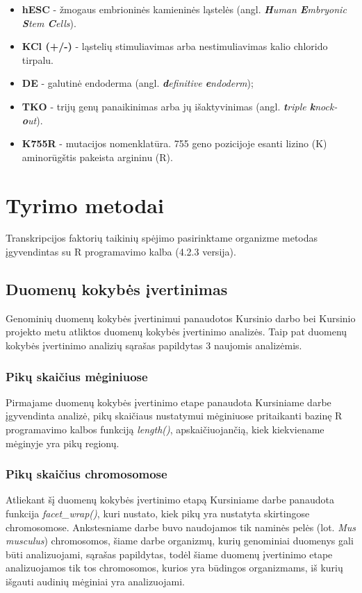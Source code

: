 \documentclass[12pt]{article}
\begin{document}
\begin{itemize}
    \item \textbf{hESC} - žmogaus embrioninės kamieninės ląstelės
          (angl. \emph{\textbf{H}uman \textbf{E}mbryonic \textbf{S}tem
          \textbf{C}ells}).
    \item \textbf{KCl (+/-)} - ląstelių stimuliavimas arba nestimuliavimas kalio
          chlorido tirpalu.
    \item \textbf{DE} - galutinė endoderma (angl. \emph{\textbf{d}efinitive
          \textbf{e}ndoderm});
    \item \textbf{TKO} - trijų genų panaikinimas arba jų išaktyvinimas
          (angl. \emph{\textbf{t}riple \textbf{k}nock-\textbf{o}ut}).
    \item \textbf{K755R} - mutacijos nomenklatūra. 755 geno pozicijoje esanti
          lizino (K) aminorūgštis pakeista argininu (R).
\end{itemize}

\newpage


\section{Tyrimo metodai}
Transkripcijos faktorių taikinių spėjimo pasirinktame organizme metodas
įgyvendintas su R programavimo kalba\cite{R} (4.2.3 versija).

\subsection{Duomenų kokybės įvertinimas}
Genominių duomenų kokybės įvertinimui panaudotos Kursinio darbo bei Kursinio
projekto metu atliktos duomenų kokybės įvertinimo analizės. Taip pat
duomenų kokybės įvertinimo analizių sąrašas papildytas 3 naujomis analizėmis.

\subsubsection*{Pikų skaičius mėginiuose}
Pirmajame duomenų kokybės įvertinimo etape panaudota Kursiniame darbe
įgyvendinta analizė, pikų skaičiaus nustatymui mėginiuose pritaikanti bazinę R
programavimo kalbos funkciją \emph{length()}, apskaičiuojančią, kiek kiekviename
mėginyje yra pikų regionų.

\subsubsection*{Pikų skaičius chromosomose}
Atliekant šį duomenų kokybės įvertinimo etapą Kursiniame darbe panaudota
funkcija \emph{facet\_wrap()}, kuri nustato, kiek pikų yra nustatyta skirtingose
chromosomose. Ankstesniame darbe buvo naudojamos tik naminės pelės
(lot. \emph{Mus musculus}) chromosomos, šiame darbe organizmų, kurių genominiai
duomenys gali būti analizuojami, sąrašas papildytas, todėl šiame duomenų
įvertinimo etape analizuojamos tik tos chromosomos, kurios yra būdingos
organizmams, iš kurių išgauti audinių mėginiai yra analizuojami.
\end{document}
